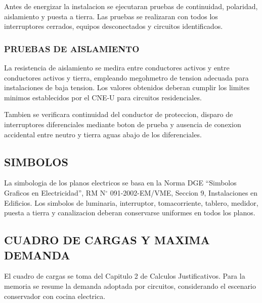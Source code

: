 Antes de energizar la instalacion se ejecutaran pruebas de continuidad, polaridad, aislamiento y puesta a tierra. Las pruebas se realizaran con todos los interruptores cerrados, equipos desconectados y circuitos identificados.

\subsubsection{PRUEBAS DE AISLAMIENTO}

La resistencia de aislamiento se medira entre conductores activos y entre conductores activos y tierra, empleando megohmetro de tension adecuada para instalaciones de baja tension. Los valores obtenidos deberan cumplir los limites minimos establecidos por el CNE-U para circuitos residenciales.

Tambien se verificara continuidad del conductor de proteccion, disparo de interruptores diferenciales mediante boton de prueba y ausencia de conexion accidental entre neutro y tierra aguas abajo de los diferenciales.

\subsection{SIMBOLOS}

La simbologia de los planos electricos se basa en la Norma DGE ``Simbolos Graficos en Electricidad'', RM N\(^\circ\) 091-2002-EM/VME, Seccion 9, Instalaciones en Edificios. Los simbolos de luminaria, interruptor, tomacorriente, tablero, medidor, puesta a tierra y canalizacion deberan conservarse uniformes en todos los planos.

\subsection{CUADRO DE CARGAS Y MAXIMA DEMANDA}

El cuadro de cargas se toma del Capitulo 2 de Calculos Justificativos. Para la memoria se resume la demanda adoptada por circuitos, considerando el escenario conservador con cocina electrica.


